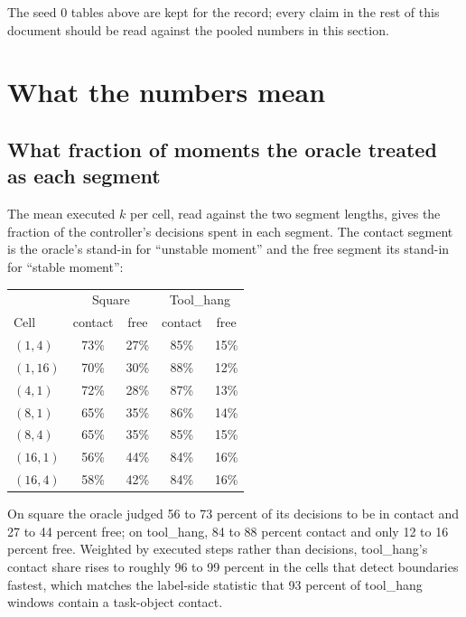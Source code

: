 \documentclass[11pt]{article}
\begin{document}
The seed 0 tables above are kept for the record; every claim in the rest of this
document should be read against the pooled numbers in this section.

\section{What the numbers mean}

\subsection{What fraction of moments the oracle treated as each segment}
\label{sec:fractions}

The mean executed $k$ per cell, read against the two segment lengths, gives the
fraction of the controller's decisions spent in each segment. The contact segment
is the oracle's stand-in for ``unstable moment'' and the free segment its stand-in
for ``stable moment'':

\begin{center}
\small
\begin{tabular}{@{}lcccc@{}}
\toprule
 & \multicolumn{2}{c}{Square} & \multicolumn{2}{c}{Tool\_hang} \\
Cell & contact & free & contact & free \\
\midrule
$(1,4)$  & 73\% & 27\% & 85\% & 15\% \\
$(1,16)$ & 70\% & 30\% & 88\% & 12\% \\
$(4,1)$  & 72\% & 28\% & 87\% & 13\% \\
$(8,1)$  & 65\% & 35\% & 86\% & 14\% \\
$(8,4)$  & 65\% & 35\% & 85\% & 15\% \\
$(16,1)$ & 56\% & 44\% & 84\% & 16\% \\
$(16,4)$ & 58\% & 42\% & 84\% & 16\% \\
\bottomrule
\end{tabular}
\end{center}

On square the oracle judged 56 to 73 percent of its decisions to be in contact and
27 to 44 percent free; on tool\_hang, 84 to 88 percent contact and only 12 to 16
percent free. Weighted by executed steps rather than decisions, tool\_hang's
contact share rises to roughly 96 to 99 percent in the cells that detect boundaries
fastest, which matches the label-side statistic that 93 percent of tool\_hang
windows contain a task-object contact.
\end{document}
